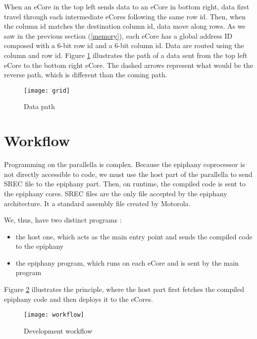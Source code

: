 When an \gls{eCore} in the top left sends data to an \gls{eCore} in bottom right, data first travel through each intermediate \glspl{eCore} following the same row id. Then, when the column id matches the destination column id, data move along rows. As we saw in the previous section (\ref{memory}), each \gls{eCore} has a global address ID composed with a 6-bit row id and a 6-bit column id. Data are routed using the column and row id. Figure \ref{fig grid} illustrates the path of a data sent from the top left \gls{eCore} to the bottom right \gls{eCore}. The dashed arrows represent what would be the reverse path, which is different than the coming path.

\begin{figure}[h!]
\centering
\texttt{[image: grid]}
\caption{Data path}
\label{fig grid}
\end{figure}

\section{Workflow} \label{workflow}

Programming on the parallella is complex. Because the \gls{epiphany} coprocessor is not directly accessible to code, we must use the host part of the parallella to send \gls{SREC} file to the \gls{epiphany} part. Then, on runtime, the compiled code is sent to the \gls{epiphany} cores. \gls{SREC} files are the only file accepted by the \gls{epiphany} architecture. It a standard assembly file created by Motorola.

We, thus, have two distinct programs : 

\begin{itemize}
  \item the host one, which acts as the main entry point and sends the compiled code to the \gls{epiphany}
  \item the \gls{epiphany} program, which runs on each \gls{eCore} and is sent by the main program
\end{itemize}

Figure \ref{fig workflow} illustrates the principle, where the host part first fetches the compiled \gls{epiphany} code and then deploys it to the \glspl{eCore}.

\begin{figure}[h!]
\centering
\texttt{[image: workflow]}
\caption{Development workflow}
\label{fig workflow}
\end{figure}

